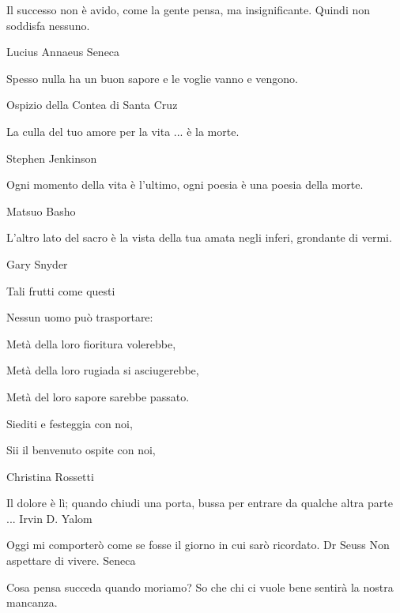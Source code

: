 \documentclass[12pt]{book} %
\begin{document}
\begin{mdframed}[linewidth=1pt]
\bigskip

Il successo non è avido, come la gente pensa, ma insignificante. Quindi non soddisfa nessuno.

Lucius Annaeus Seneca 


\bigskip

Spesso nulla ha un buon sapore e le voglie vanno e vengono.

Ospizio della Contea di Santa Cruz


\bigskip

La culla del tuo amore per la vita ... è la morte.

Stephen Jenkinson


\bigskip

Ogni momento della vita è l'ultimo, ogni poesia è una poesia della morte.

Matsuo Basho


\bigskip

L'altro lato del {\textquotedbl}sacro{\textquotedbl} è la vista della tua amata negli inferi, grondante di vermi.

Gary Snyder


\bigskip

Tali frutti come questi 

Nessun uomo può trasportare: 

Metà della loro fioritura volerebbe, 

Metà della loro rugiada si asciugerebbe, 

Metà del loro sapore sarebbe passato. 

Siediti e festeggia con noi, 

Sii il benvenuto ospite con noi, 

Christina Rossetti


\bigskip

Il dolore è lì; quando chiudi una porta, bussa per entrare da qualche altra parte ...\newline
Irvin D. Yalom


\bigskip

Oggi mi comporterò come se fosse il giorno in cui sarò ricordato.\newline
Dr Seuss\newline
\newline
Non aspettare di vivere.\newline
Seneca


\bigskip

Cosa pensa succeda quando moriamo? So che chi ci vuole bene sentirà la nostra mancanza.


\end{mdframed}
\end{document}
